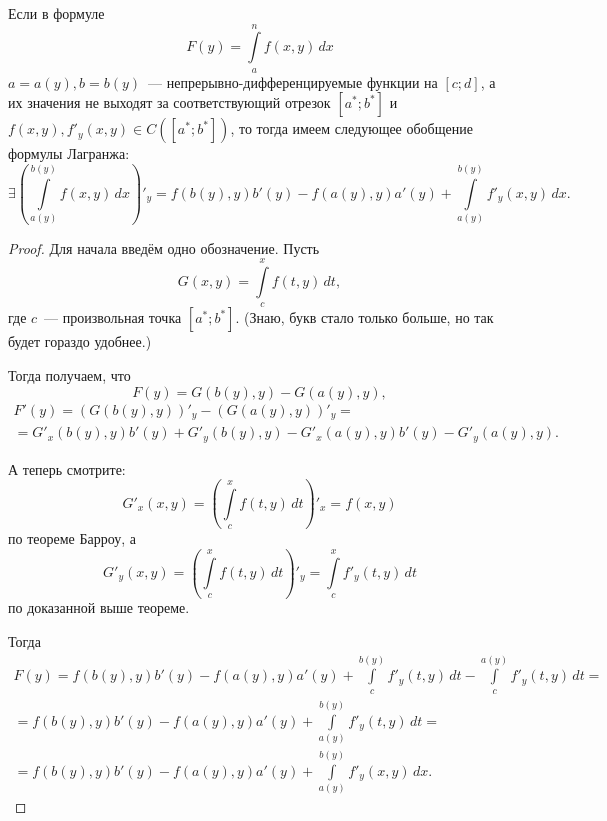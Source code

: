 \documentclass[../../main.tex]{subfiles}
\begin{document}
\begin{rem}
	Если в формуле
	\[F(y) = \int\limits_a^n f(x, y)\,dx\]
	$a = a(y), b = b(y)$~--- непрерывно-дифференцируемые функции на $[c; d]$,
	а их значения не выходят за соответствующий отрезок $[a^*;b^*]$ и $f(x, y),
	f'_y(x, y)\in C([a^*; b^*])$, то тогда имеем следующее 
	обобщение формулы Лагранжа:
	\[\exists \left(\int\limits_{a(y)}^{b(y)} f(x, y)\,dx\right)'_y = 
	f(b(y), y)b'(y) - f(a(y), y)a'(y) + 
	\int\limits_{a(y)}^{b(y)}f'_y(x, y)\,dx.\]
\end{rem}

\begin{proof}
	Для начала введём одно обозначение. Пусть
	\[G(x, y) = \int\limits_c^x f(t, y)\,dt,\]
	где $c$~--- произвольная точка $[a^*;b^*]$. 
	(Знаю, букв стало только больше, но так будет гораздо удобнее.)
	
	Тогда получаем, что
	\[F(y) = G(b(y), y) - G(a(y), y),\]
	\begin{gather*}
		F'(y) = \left(G(b(y), y)\right)'_y -\left(G(a(y), y)\right)'_y =\\
		= G'_x(b(y), y)b'(y) + G'_y(b(y), y) - G'_x(a(y), y)b'(y) - 
		G'_y(a(y), y).
	\end{gather*}
	
	А теперь смотрите:
	\[G'_x(x, y) = \left(\int\limits_c^x f(t, y)\,dt\right)'_x = f(x, y)\]
	по теореме Барроу, а
	\[G'_y(x, y) = \left(\int\limits_c^x f(t, y)\,dt\right)'_y =
	\int\limits_c^x f'_y(t, y)\,dt\]
	по доказанной выше теореме.
	
	Тогда
	\begin{gather*}
		F(y) = f(b(y), y)b'(y) - f(a(y), y)a'(y) + 
		\int\limits_c^{b(y)} f'_y(t, y)\,dt - 
		\int\limits_c^{a(y)} f'_y(t, y)\,dt =\\
		= f(b(y), y)b'(y) - f(a(y), y)a'(y) + 
		\int\limits_{a(y)}^{b(y)} f'_y(t, y)\,dt =\\
		= f(b(y), y)b'(y) - f(a(y), y)a'(y) + 
		\int\limits_{a(y)}^{b(y)} f'_y(x, y)\,dx.
	\end{gather*}
\end{proof}
\end{document}
